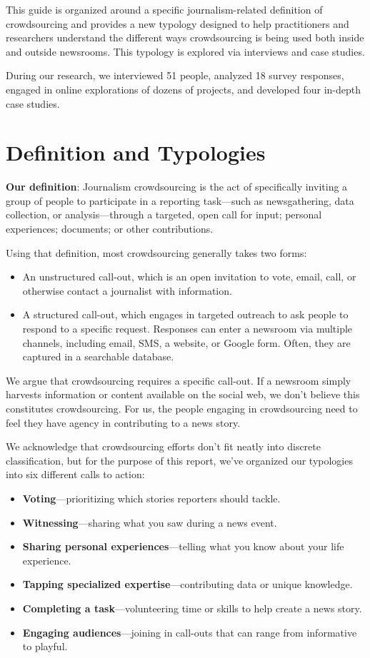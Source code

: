 This guide is organized around a specific journalism-related definition of crowdsourcing and provides a new typology designed to help practitioners and researchers understand the different ways crowdsourcing is being used both inside and outside newsrooms. This typology is explored via interviews and case studies. 

During our research, we interviewed 51 people, analyzed 18 survey responses, engaged in online explorations of dozens of projects, and developed four in-depth case studies.

\section{Definition and Typologies}

\textbf{Our definition}: Journalism crowdsourcing is the act of specifically inviting a group of people to participate in a reporting task---such as newsgathering, data collection, or analysis---through a targeted, open call for input; personal experiences; documents; or other contributions.

Using that definition, most crowdsourcing generally takes two forms:
 
\begin{itemize}
\item An unstructured call-out, which is an open invitation to vote, email, call, or otherwise contact a journalist with information.\item A structured call-out, which engages in targeted outreach to ask people to respond to a specific request. Responses can enter a newsroom via multiple channels, including email, SMS, a website, or Google form. Often, they are captured in a searchable database.
\end{itemize}

We argue that crowdsourcing requires a specific call-out. If a newsroom simply harvests information or content available on the social web, we don’t believe this constitutes crowdsourcing. For us, the people engaging in crowdsourcing need to feel they have agency in contributing to a news story.

We acknowledge that crowdsourcing efforts don’t fit neatly into discrete classification, but for the purpose of this report, we’ve organized our typologies into six different calls to action: 

\begin{itemize}
\item \textbf{Voting}---prioritizing which stories reporters should tackle. 
\item \textbf{Witnessing}---sharing what you saw during a news event.
\item \textbf{Sharing personal experiences}---telling what you know about your life experience. 
\item \textbf{Tapping specialized expertise}---contributing data or unique knowledge.
\item \textbf{Completing a task}---volunteering time or skills to help create a news story.
\item \textbf{Engaging audiences}---joining in call-outs that can range from informative to playful.
\end{itemize}

